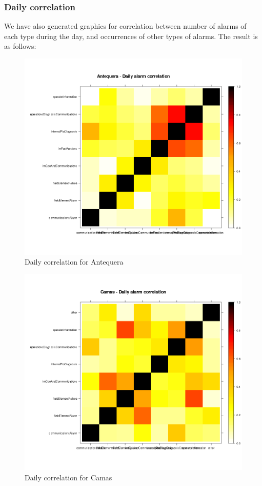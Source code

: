 \documentclass[a4paper,10pt]{book}
\begin{document}
\clearpage

\subsubsection{Daily correlation}

We have also generated graphics for correlation between number of alarms of each type during the day, and occurrences of other types of alarms. The result is as follows:

\begin{figure}[h!]
 \centering
 \includegraphics[height=0.4\textheight]{./img/antequera_correlation.png}
 \caption{Daily correlation for Antequera}
 \label{fig:anteq}
\end{figure}
\begin{figure}[h!]
 \centering
 \includegraphics[height=0.4\textheight]{./img/camas_correlation.png}
 \caption{Daily correlation for Camas}
 \label{fig:camas}
\end{figure}
\end{document}
